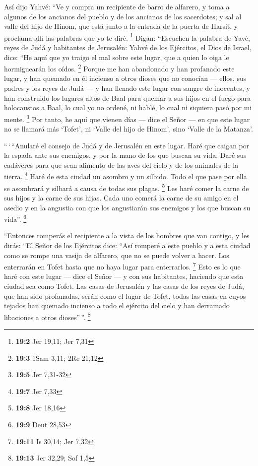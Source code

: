  Así dijo Yahvé: ``Ve y compra un recipiente de barro de
alfarero, y toma a algunos de los ancianos del pueblo y de los ancianos
de los sacerdotes;  y sal al valle del hijo de Hinom, que
está junto a la entrada de la puerta de Harsit, y proclama allí las
palabras que yo te diré. \footnote{\textbf{19:2} Jer 19,11; Jer 7,31}
 Digan: ``Escuchen la palabra de Yavé, reyes de Judá y
habitantes de Jerusalén: Yahvé de los Ejércitos, el Dios de Israel,
dice: ``He aquí que yo traigo el mal sobre este lugar, que a quien lo
oiga le hormiguearán los oídos. \footnote{\textbf{19:3} 1Sam 3,11; 2Re
  21,12}  Porque me han abandonado y han profanado este
lugar, y han quemado en él incienso a otros dioses que no conocían ---
ellos, sus padres y los reyes de Judá --- y han llenado este lugar con
sangre de inocentes,  y han construido los lugares altos
de Baal para quemar a sus hijos en el fuego para holocaustos a Baal, lo
cual yo no ordené, ni hablé, lo cual ni siquiera pasó por mi mente.
\footnote{\textbf{19:5} Jer 7,31-32}  Por tanto, he aquí
que vienen días --- dice el Señor --- en que este lugar no se llamará
más `Tofet', ni `Valle del hijo de Hinom', sino `Valle de la Matanza'.

 ``\,`\,``Anularé el consejo de Judá y de Jerusalén en
este lugar. Haré que caigan por la espada ante sus enemigos, y por la
mano de los que buscan su vida. Daré sus cadáveres para que sean
alimento de las aves del cielo y de los animales de la tierra.
\footnote{\textbf{19:7} Jer 7,33}  Haré de esta ciudad un
asombro y un silbido. Todo el que pase por ella se asombrará y silbará a
causa de todas sus plagas. \footnote{\textbf{19:8} Jer 18,16}
 Les haré comer la carne de sus hijos y la carne de sus
hijas. Cada uno comerá la carne de su amigo en el asedio y en la
angustia con que los angustiarán sus enemigos y los que buscan su
vida''. \footnote{\textbf{19:9} Deut 28,53}

 ``Entonces romperás el recipiente a la vista de los
hombres que van contigo,  y les dirás: ``El Señor de los
Ejércitos dice: ``Así romperé a este pueblo y a esta ciudad como se
rompe una vasija de alfarero, que no se puede volver a hacer. Los
enterrarán en Tofet hasta que no haya lugar para enterrarlos.
\footnote{\textbf{19:11} Is 30,14; Jer 7,32}  Esto es lo
que haré con este lugar --- dice el Señor --- y con sus habitantes,
haciendo que esta ciudad sea como Tofet.  Las casas de
Jerusalén y las casas de los reyes de Judá, que han sido profanadas,
serán como el lugar de Tofet, todas las casas en cuyos tejados han
quemado incienso a todo el ejército del cielo y han derramado libaciones
a otros dioses''\,''. \footnote{\textbf{19:13} Jer 32,29; Sof 1,5}

